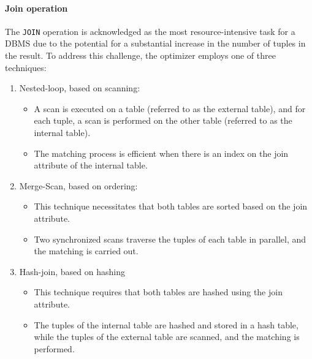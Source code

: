 \paragraph*{Join operation}
The \texttt{JOIN} operation is acknowledged as the most resource-intensive task for a DBMS due to the potential for a substantial increase in the number of tuples in the result. 
To address this challenge, the optimizer employs one of three techniques:
\begin{enumerate}
\item Nested-loop, based on scanning: 
    \begin{itemize}
        \item A scan is executed on a table (referred to as the external table), and for each tuple, a scan is performed on the other table (referred to as the internal table).
        \item The matching process is efficient when there is an index on the join attribute of the internal table.
    \end{itemize}
\item Merge-Scan, based on ordering:
    \begin{itemize}
        \item This technique necessitates that both tables are sorted based on the join attribute.
        \item Two synchronized scans traverse the tuples of each table in parallel, and the matching is carried out.
    \end{itemize}
\item Hash-join, based on hashing
    \begin{itemize}
        \item This technique requires that both tables are hashed using the join attribute.
        \item The tuples of the internal table are hashed and stored in a hash table, while the tuples of the external table are scanned, and the matching is performed.
    \end{itemize}
\end{enumerate}


